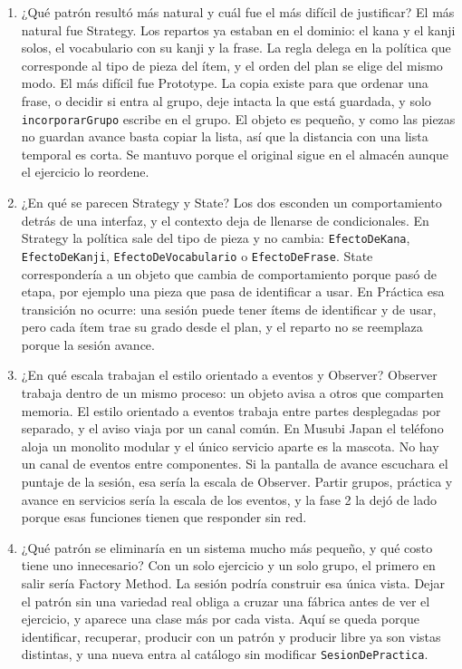 \documentclass[11pt]{article}
\begin{document}
\begin{enumerate}
  \raggedright
  \item ¿Qué patrón resultó más natural y cuál fue el más difícil de justificar? El más natural fue Strategy. Los repartos ya estaban en el dominio: el kana y el kanji solos, el vocabulario con su kanji y la frase. La regla delega en la política que corresponde al tipo de pieza del ítem, y el orden del plan se elige del mismo modo. El más difícil fue Prototype. La copia existe para que ordenar una frase, o decidir si entra al grupo, deje intacta la que está guardada, y solo \texttt{incorporarGrupo} escribe en el grupo. El objeto es pequeño, y como las piezas no guardan avance basta copiar la lista, así que la distancia con una lista temporal es corta. Se mantuvo porque el original sigue en el almacén aunque el ejercicio lo reordene.
  \item ¿En qué se parecen Strategy y State? Los dos esconden un comportamiento detrás de una interfaz, y el contexto deja de llenarse de condicionales. En Strategy la política sale del tipo de pieza y no cambia: \texttt{EfectoDeKana}, \texttt{EfectoDeKanji}, \texttt{EfectoDeVocabulario} o \texttt{EfectoDeFrase}. State correspondería a un objeto que cambia de comportamiento porque pasó de etapa, por ejemplo una pieza que pasa de identificar a usar. En Práctica esa transición no ocurre: una sesión puede tener ítems de identificar y de usar, pero cada ítem trae su grado desde el plan, y el reparto no se reemplaza porque la sesión avance.
  \item ¿En qué escala trabajan el estilo orientado a eventos y Observer? Observer trabaja dentro de un mismo proceso: un objeto avisa a otros que comparten memoria. El estilo orientado a eventos trabaja entre partes desplegadas por separado, y el aviso viaja por un canal común. En Musubi Japan el teléfono aloja un monolito modular y el único servicio aparte es la mascota. No hay un canal de eventos entre componentes. Si la pantalla de avance escuchara el puntaje de la sesión, esa sería la escala de Observer. Partir grupos, práctica y avance en servicios sería la escala de los eventos, y la fase 2 la dejó de lado porque esas funciones tienen que responder sin red.
  \item ¿Qué patrón se eliminaría en un sistema mucho más pequeño, y qué costo tiene uno innecesario? Con un solo ejercicio y un solo grupo, el primero en salir sería Factory Method. La sesión podría construir esa única vista. Dejar el patrón sin una variedad real obliga a cruzar una fábrica antes de ver el ejercicio, y aparece una clase más por cada vista. Aquí se queda porque identificar, recuperar, producir con un patrón y producir libre ya son vistas distintas, y una nueva entra al catálogo sin modificar \texttt{SesionDePractica}.

\end{enumerate}
\end{document}
